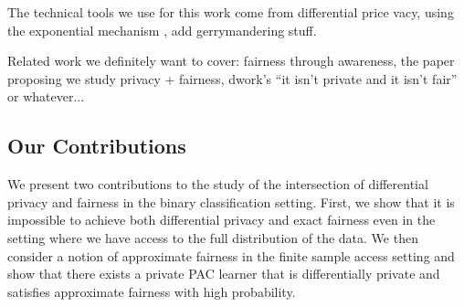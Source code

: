 The technical tools we use for this work come from differential price
vacy, using the exponential mechanism \cite{2dplimits}, add gerrymandering stuff.



Related work we definitely want to cover: fairness through awareness,
the paper proposing we study privacy + fairness, dwork's ``it isn't
private and it isn't fair'' or whatever...

\subsection{Our Contributions}
We present two contributions to the study of the intersection of
differential privacy and fairness in the binary classification setting.
First, we show that it is impossible to achieve both differential
privacy and exact fairness even in the setting where we have access to
the full distribution of the data. We then consider a notion of
approximate fairness in the finite sample access setting and show that
there exists a private PAC learner that is differentially private and
satisfies approximate fairness with high probability. 
